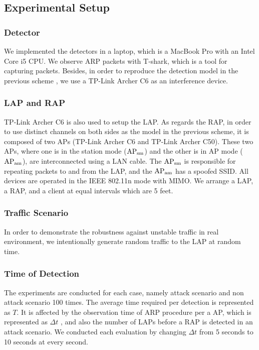 \documentclass[paper]{ieice}
\begin{document}
\subsection{Experimental Setup}
\subsubsection{Detector}
We implemented the detectors in a laptop, which is a MacBook Pro with an Intel Core i5 CPU.
We observe ARP packets with T-shark, which is a tool for capturing packets\cite{wire}.
Besides, in order to reproduce the detection model in the previous scheme \cite{previous}, we use a TP-Link Archer C6 as an interference device.

\subsubsection{LAP and RAP}
TP-Link Archer C6 is also used to setup the LAP.
As regards the RAP, in order to use distinct channels on both sides as the model in the previous scheme, it is composed of two APs (TP-Link Archer C6 and TP-Link Archer C50).
These two APs, where one is in the station mode ($\rm AP_{sm}$) and the other is in AP mode ($\rm AP_{am}$), are interconnected using a LAN cable.
The $\rm AP_{sm}$ is responsible for repeating packets to and from the LAP, and the $\rm AP_{am}$ has a spoofed SSID.
All devices are operated in the IEEE 802.11n mode with MIMO.
We arrange a LAP, a RAP, and a client at equal intervals which are 5 feet.

\subsubsection{Traffic Scenario}
In order to demonstrate the robustness against unstable traffic in real environment, we intentionally generate random traffic to the LAP at random time.

\subsubsection{Time of Detection}
The experiments are conducted for each case, namely attack scenario and non attack scenario 100 times.
The average time required per detection is represented as $T$.
It is affected by the observation time of ARP procedure per a AP, which is represented as $\Delta t$ , and also the number of LAPs before a RAP is detected in an attack scenario.
We conducted each evaluation by changing $\Delta t$ from 5 seconds to 10 seconds at every second.
\end{document}
